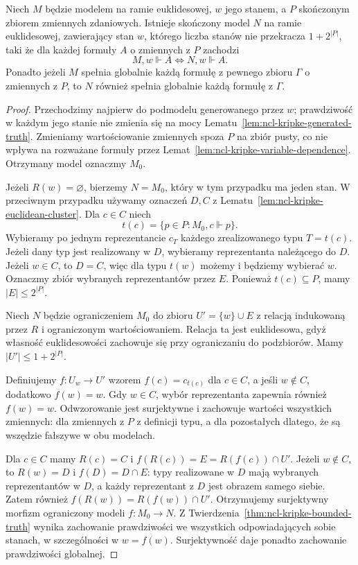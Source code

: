 \begin{twierdzenie}
\label{thm:ncl-kripke-euclidean-finite-reduction}
Niech $M$ będzie modelem na ramie euklidesowej,
$w$ jego stanem, a $P$ skończonym zbiorem
zmiennych zdaniowych. Istnieje skończony
model $N$ na ramie euklidesowej, zawierający
stan $w$, którego liczba stanów nie przekracza
$1+2^{|P|}$, taki że dla każdej formuły $A$
o zmiennych z $P$ zachodzi
\[
 M,w\Vdash A\iff N,w\Vdash A.
\]
Ponadto jeżeli $M$ spełnia globalnie każdą
formułę z pewnego zbioru $\Gamma$ o zmiennych
z $P$, to $N$ również spełnia globalnie
każdą formułę z $\Gamma$.
\end{twierdzenie}
\begin{proof}
Przechodzimy najpierw do podmodelu generowanego
przez $w$; prawdziwość w każdym jego stanie
nie zmienia się na mocy
Lematu~\ref{lem:ncl-kripke-generated-truth}.
Zmieniamy wartościowanie zmiennych spoza $P$
na zbiór pusty, co nie wpływa na rozważane
formuły przez
Lemat~\ref{lem:ncl-kripke-variable-dependence}.
Otrzymany model oznaczmy $M_0$.

Jeżeli $R(w)=\varnothing$, bierzemy $N=M_0$,
który w tym przypadku ma jeden stan.
W przeciwnym przypadku używamy oznaczeń
$D,C$ z
Lematu~\ref{lem:ncl-kripke-euclidean-cluster}.
Dla $c\in C$ niech
\[
 t(c)=\{p\in P:M_0,c\Vdash p\}.
\]
Wybieramy po jednym reprezentancie $c_T$
każdego zrealizowanego typu $T=t(c)$.
Jeżeli dany typ jest realizowany w $D$,
wybieramy reprezentanta należącego do $D$.
Jeżeli $w\in C$, to $D=C$, więc dla typu
$t(w)$ możemy i będziemy wybierać $w$.
Oznaczmy zbiór wybranych reprezentantów przez
$E$. Ponieważ $t(c)\subseteq P$, mamy
$|E|\leq 2^{|P|}$.

Niech $N$ będzie ograniczeniem $M_0$
do zbioru $U'=\{w\}\cup E$ z relacją
indukowaną przez $R$ i ograniczonym wartościowaniem.
Relacja ta jest euklidesowa, gdyż własność
euklidesowości zachowuje się przy ograniczaniu
do podzbiorów. Mamy $|U'|\leq 1+2^{|P|}$.

Definiujemy $f:U_w\to U'$ wzorem
$f(c)=c_{t(c)}$ dla $c\in C$, a jeśli
$w\notin C$, dodatkowo $f(w)=w$.
Gdy $w\in C$, wybór reprezentanta zapewnia
również $f(w)=w$. Odwzorowanie jest
surjektywne i zachowuje wartości wszystkich
zmiennych: dla zmiennych z $P$ z definicji
typu, a dla pozostałych dlatego, że są
wszędzie fałszywe w obu modelach.

Dla $c\in C$ mamy $R(c)=C$ i
$f(R(c))=E=R(f(c))\cap U'$.
Jeżeli $w\notin C$, to $R(w)=D$ i
$f(D)=D\cap E$: typy realizowane w $D$
mają wybranych reprezentantów w $D$,
a każdy reprezentant z $D$ jest obrazem
samego siebie. Zatem również
$f(R(w))=R(f(w))\cap U'$.
Otrzymujemy surjektywny morfizm ograniczony
modeli $f:M_0\to N$.
Z Twierdzenia~\ref{thm:ncl-kripke-bounded-truth}
wynika zachowanie prawdziwości we wszystkich
odpowiadających sobie stanach, w szczególności
w $w=f(w)$. Surjektywność daje ponadto
zachowanie prawdziwości globalnej.
\end{proof}

